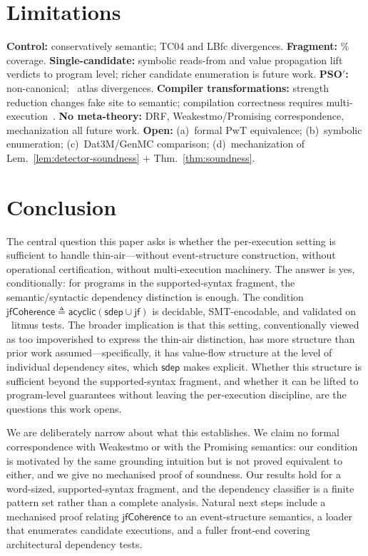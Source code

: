 \documentclass{llncs}
\newcommand{\sdep}{\mathsf{sdep}}
\newcommand{\jf}{\mathsf{jf}}
\newcommand{\jfCoherence}{\textsf{jfCoherence}}
\begin{document}
\section{Limitations}
\label{sec:limitations}

\textbf{Control:} conservatively semantic; TC04 and LBfc divergences.
\textbf{Fragment:} \CoveragePercent\% coverage. \textbf{Single-candidate:}
symbolic reads-from and value propagation lift verdicts to program level;
richer candidate enumeration is future work. \textbf{PSO$'$:}
non-canonical; \PsoCanonicalDivergences~atlas divergences. \textbf{Compiler transformations:}
strength reduction changes fake site to semantic; compilation correctness
requires multi-execution~\cite{sevcik2011c11comp,chakraborty2019grounding}.
\textbf{No meta-theory:} DRF, Weakestmo/Promising correspondence,
mechanization all future work. \textbf{Open:} (a)~formal PwT equivalence;
(b)~symbolic enumeration; (c)~Dat3M/GenMC comparison; (d)~mechanization of
Lem.~\ref{lem:detector-soundness} + Thm.~\ref{thm:soundness}.

\section{Conclusion}
\label{sec:conclusion}

The central question this paper asks is whether the per-execution setting is
sufficient to handle thin-air---without event-structure construction, without
operational certification, without multi-execution machinery. The answer is
yes, conditionally: for programs in the supported-syntax fragment, the
semantic/syntactic dependency distinction is enough. The condition
$\jfCoherence \triangleq \mathsf{acyclic}(\sdep \cup \jf)$ is decidable,
SMT-encodable, and validated on \CorpusSize~litmus tests. The broader implication
is that this setting, conventionally viewed as too impoverished to express
the thin-air distinction, has more structure than prior work
assumed---specifically, it has value-flow structure at the level of individual
dependency sites, which $\sdep$ makes explicit. Whether this structure is
sufficient beyond the supported-syntax fragment, and whether it can be lifted
to program-level guarantees without leaving the per-execution discipline, are
the questions this work opens.

We are deliberately narrow about what this establishes. We claim no formal
correspondence with Weakestmo or with the Promising semantics: our condition is
motivated by the same grounding intuition but is not proved equivalent to
either, and we give no mechanised proof of soundness. Our results hold for a
word-sized, supported-syntax fragment, and the dependency classifier is a
finite pattern set rather than a complete analysis. Natural next steps include
a mechanised proof relating $\jfCoherence$ to an event-structure semantics, a
loader that enumerates candidate executions, and a fuller front-end covering
architectural dependency tests.
\end{document}
